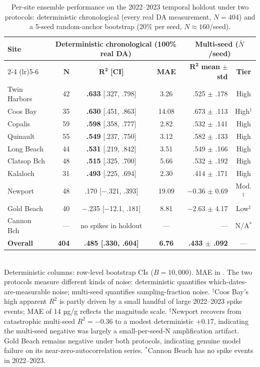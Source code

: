 \documentclass[toxins,article,submit,moreauthors]{Definitions/mdpi}
\begin{document}
\begin{table}[H]
\caption{Per-site ensemble performance on the 2022--2023 temporal holdout under two protocols: deterministic chronological (every real DA measurement, $N = 404$) and a 5-seed random-anchor bootstrap (20\% per seed, $N \approx 160$/seed).}
\label{tab:temporal-holdout}
\centering\scriptsize
\begin{tabular*}{\linewidth}{@{\extracolsep{\fill}}lrccrc}
\toprule
\multirow{2}{*}{\textbf{Site}} & \multicolumn{3}{c}{\textbf{Deterministic chronological} (100\% real DA)} & \multicolumn{2}{c}{\textbf{Multi-seed} ($\bar{N}$/seed)} \\
\cmidrule(lr){2-4} \cmidrule(lr){5-6}
              & $\boldsymbol{N}$ & $\boldsymbol{R^2}$ \textbf{[CI]} & \textbf{MAE} & $\boldsymbol{R^2}$ \textbf{mean} $\pm$ \textbf{std} & \textbf{Tier} \\
\midrule
Twin Harbors  & 42  & \textbf{.633} [.327, .798] & 3.26  & .525 $\pm$ .178 & High \\
Coos Bay      & 35  & \textbf{.630} [.451, .863] & 14.08 & .673 $\pm$ .113 & High$^\dagger$ \\
Copalis       & 59  & \textbf{.598} [.358, .777] & 2.82  & .532 $\pm$ .141 & High \\
Quinault      & 55  & \textbf{.549} [.237, .750] & 3.12  & .582 $\pm$ .133 & High \\
Long Beach    & 44  & \textbf{.531} [.219, .842] & 3.51  & .549 $\pm$ .166 & High \\
Clatsop Bch   & 48  & \textbf{.515} [.325, .700] & 5.66  & .532 $\pm$ .192 & High \\
Kalaloch      & 31  & \textbf{.493} [.225, .694] & 2.30  & .414 $\pm$ .171 & High \\
\addlinespace
Newport       & 48  & .170 [$-$.321, .393] & 19.09 & $-$0.36 $\pm$ 0.69 & Mod.$^\ddagger$ \\
\addlinespace
Gold Beach    & 40  & $-$.235 [$-$12.1, .181] & 8.81 & $-$2.63 $\pm$ 4.17 & Low$^\ddagger$ \\
Cannon Bch    & --- & no spikes in holdout & --- & --- & N/A$^*$ \\
\midrule
\textbf{Overall} & \textbf{404} & \textbf{.485 [.330, .604]} & \textbf{6.76} & \textbf{.433 $\pm$ .092} & --- \\
\bottomrule
\end{tabular*}
\vspace{0.3em}\\
\footnotesize{Deterministic columns: row-level bootstrap CIs ($B = 10{,}000$). MAE in \si{\microgrampeg}. The two protocols measure different kinds of noise: deterministic quantifies which-dates-are-measurable noise; multi-seed quantifies sampling-fraction noise. $^\dagger$Coos Bay's high apparent $R^2$ is partly driven by a small handful of large 2022--2023 spike events; MAE of 14 µg/g reflects the magnitude scale. $^\ddagger$Newport recovers from catastrophic multi-seed $R^2 = -0.36$ to a modest deterministic $+0.17$, indicating the multi-seed negative was largely a small-per-seed-N amplification artifact. Gold Beach remains negative under both protocols, indicating genuine model failure on its near-zero-autocorrelation series. $^*$Cannon Beach has no spike events in 2022--2023.}

\end{table}
\end{document}
